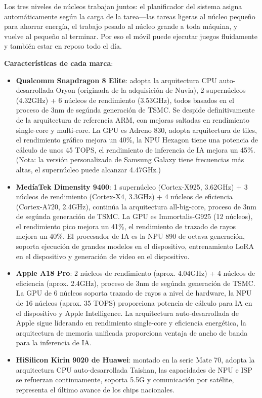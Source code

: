 Los tres niveles de núcleos trabajan juntos: el planificador del sistema asigna automáticamente según la carga de la tarea—las tareas ligeras al núcleo pequeño para ahorrar energía, el trabajo pesado al núcleo grande a toda máquina, y vuelve al pequeño al terminar. Por eso el móvil puede ejecutar juegos fluidamente y también estar en reposo todo el día.

\textbf{Características de cada marca}:

\begin{itemize}
  \item \textbf{Qualcomm Snapdragon 8 Elite}: adopta la arquitectura CPU auto-desarrollada Oryon (originada de la adquisición de Nuvia), 2 supernúcleos (4.32GHz) + 6 núcleos de rendimiento (3.53GHz), todos basados en el proceso de 3nm de segúnda generación de TSMC. Se despide definitivamente de la arquitectura de referencia ARM, con mejoras saltadas en rendimiento single-core y multi-core. La GPU es Adreno 830, adopta arquitectura de tiles, el rendimiento gráfico mejora un 40\%, la NPU Hexagon tiene una potencia de cálculo de unos 45 TOPS, el rendimiento de inferencia de IA mejora un 45\%. (Nota: la versión personalizada de Samsung Galaxy tiene frecuencias más altas, el supernúcleo puede alcanzar 4.47GHz.)
  \item \textbf{MedíaTek Dimensity 9400}: 1 supernúcleo (Cortex-X925, 3.62GHz) + 3 núcleos de rendimiento (Cortex-X4, 3.3GHz) + 4 núcleos de eficiencia (Cortex-A720, 2.4GHz), continúa la arquitectura all-big-core, proceso de 3nm de segúnda generación de TSMC. La GPU es Immortalis-G925 (12 núcleos), el rendimiento pico mejora un 41\%, el rendimiento de trazado de rayos mejora un 40\%. El procesador de IA es la NPU 890 de octava generación, soporta ejecución de grandes modelos en el dispositivo, entrenamiento LoRA en el dispositivo y generación de video en el dispositivo.
  \item \textbf{Apple A18 Pro}: 2 núcleos de rendimiento (aprox. 4.04GHz) + 4 núcleos de eficiencia (aprox. 2.4GHz), proceso de 3nm de segúnda generación de TSMC. La GPU de 6 núcleos soporta trazado de rayos a nivel de hardware, la NPU de 16 núcleos (aprox. 35 TOPS) proporciona potencia de cálculo para IA en el dispositivo y Apple Intelligence. La arquitectura auto-desarrollada de Apple sigue líderando en rendimiento single-core y eficiencia energética, la arquitectura de memoria unificada proporciona ventaja de ancho de banda para la inferencia de IA.
  \item \textbf{HiSilicon Kirin 9020 de Huawei}: montado en la serie Mate 70, adopta la arquitectura CPU auto-desarrollada Taishan, las capacidades de NPU e ISP se refuerzan continuamente, soporta 5.5G y comunicación por satélite, representa el último avance de los chips nacionales.
\end{itemize}

